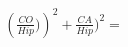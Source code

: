 \documentclass[preview]{standalone}
\begin{document}
\begin{align*}
\left(\frac{CO}{Hip})\right)^2+\frac{CA}{Hip})^2=
\end{align*}
\end{document}
